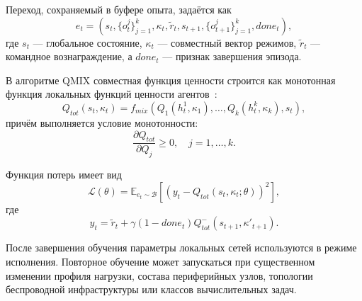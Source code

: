 Переход, сохраняемый в буфере опыта, задаётся как
\begin{equation}
    e_t = \left(s_t, \{o^j_t\}_{j=1}^{k}, \kappa_t, \widetilde{r}_t, s_{t+1}, \{o^j_{t+1}\}_{j=1}^{k}, done_t\right),
    \label{eq:ch5_experience}
\end{equation}
где $s_t$ --- глобальное состояние, $\kappa_t$ --- совместный вектор режимов, $\widetilde{r}_t$ --- командное вознаграждение, а $done_t$ --- признак завершения эпизода.

В алгоритме QMIX совместная функция ценности строится как монотонная функция локальных функций ценности агентов~\cite{Rashid2018QMIX}:
\begin{equation}
    Q_{tot}(s_t,\kappa_t) = f_{mix}\left(Q_1(h^1_t,\kappa_1),\ldots,Q_k(h^k_t,\kappa_k),s_t\right),
    \label{eq:ch5_qmix_total}
\end{equation}
причём выполняется условие монотонности:
\begin{equation}
    \frac{\partial Q_{tot}}{\partial Q_j} \geq 0, \quad j=1,\ldots,k.
    \label{eq:ch5_qmix_monotonicity}
\end{equation}

Функция потерь имеет вид
\begin{equation}
    \mathcal{L}(\theta) = \mathbb{E}_{e_t\sim\mathcal{B}}\left[\left(y_t - Q_{tot}(s_t,\kappa_t;\theta)\right)^2\right],
    \label{eq:ch5_qmix_loss}
\end{equation}
где
\begin{equation}
    y_t = \widetilde{r}_t + \gamma (1-done_t) Q^{-}_{tot}(s_{t+1},\kappa'_{t+1}).
    \label{eq:ch5_qmix_target}
\end{equation}

После завершения обучения параметры локальных сетей используются в режиме исполнения. Повторное обучение может запускаться при существенном изменении профиля нагрузки, состава периферийных узлов, топологии беспроводной инфраструктуры или классов вычислительных задач.

